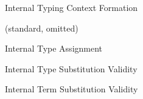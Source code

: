 \begin{figure}[p]
\small\fbox{$\Delta \vdash \Gamma$} \vspace{-25px}
\begin{mathpar}

\end{mathpar}
\caption{Internal Typing Context Formation}
\label{fig:internal-typing-context-formation}
\end{figure}

\begin{figure}[p]
\small\fbox{$\Delta~\Gamma \vdash \iota : \tau$}
\begin{mathpar}
(standard, omitted)
\end{mathpar}
\caption{Internal Type Assignment}
\label{fig:internal-type-asignment}
\end{figure}

\begin{figure}[p]
\small\fbox{$\Delta \vdash \delta : \Delta$}\vspace{-25px}
\begin{mathpar}

\end{mathpar}
\caption{Internal Type Substitution Validity}
\label{fig:internal-type-substitution-validity}
\end{figure}

\begin{figure}[p]
\small\fbox{$\Delta~\Gamma \vdash \gamma : \Gamma$}\vspace{-25px}
\begin{mathpar}

\end{mathpar}
\caption{Internal Term Substitution Validity}
\label{fig:internal-term-substitution-validity}
\end{figure}



